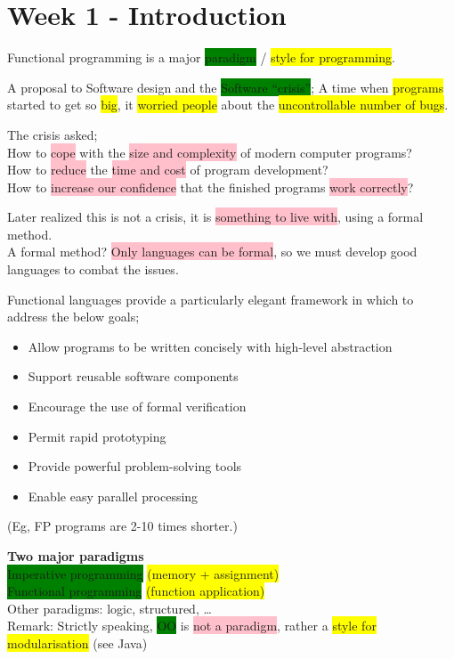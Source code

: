 \documentclass[tikz,border=10pt]{project_plan}
\begin{document}
\newpage

\tableofcontents{}\newpage


\chapter{Week 1 - Introduction}

Functional programming is a major \colorbox{green}{paradigm} / \colorbox{yellow}{style for programming}.

A proposal to Software design and the \colorbox{green}{Software “crisis”}; A time when \colorbox{yellow}{programs} started to get so \colorbox{yellow}{big}, it \colorbox{yellow}{worried people} about the \colorbox{yellow}{uncontrollable number of bugs}.

The crisis asked;\\
How to \colorbox{pink}{cope} with the \colorbox{pink}{size and complexity} of modern computer programs?\\
How to \colorbox{pink}{reduce} the \colorbox{pink}{time and cost} of program development?\\
How to \colorbox{pink}{increase our confidence} that the finished programs \colorbox{pink}{work correctly}?

Later realized this is not a crisis, it is \colorbox{pink}{something to live with}, using a formal method.\\
A formal method? \colorbox{pink}{Only languages can be formal}, so we must develop good languages to combat the issues.

Functional languages provide a particularly elegant framework in which to address the below goals;
\begin{itemize}
  \item Allow programs to be written concisely with high-level abstraction
  \item Support reusable software components
  \item Encourage the use of formal verification
  \item Permit rapid prototyping
  \item Provide powerful problem-solving tools
  \item Enable easy parallel processing
\end{itemize}
(Eg, FP programs are 2-10 times shorter.)

\textbf{Two major paradigms}\\
\colorbox{green}{Imperative programming} \colorbox{yellow}{(memory + assignment)}\\
\colorbox{green}{Functional programming} \colorbox{yellow}{(function application)}\\
Other paradigms: logic, structured, …\\
Remark: Strictly speaking, \colorbox{green}{OO} is \colorbox{pink}{not a paradigm}, rather a \colorbox{yellow}{style for modularisation} (see Java)
\end{document}
